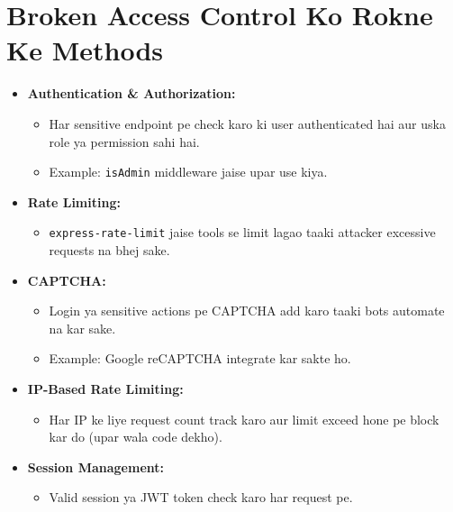 \documentclass[a4paper, 12pt]{article}
\begin{document}
\section{Broken Access Control Ko Rokne Ke Methods}
\begin{itemize}
    \item \textbf{\color{keyconceptgreen}Authentication \& Authorization:}
    \begin{itemize}
        \item Har sensitive endpoint pe check karo ki user authenticated hai aur uska role ya permission sahi hai.
        \item Example: \texttt{isAdmin} middleware jaise upar use kiya.
    \end{itemize}
    
    \item \textbf{\color{keyconceptgreen}Rate Limiting:}
    \begin{itemize}
        \item \texttt{express-rate-limit} jaise tools se limit lagao taaki attacker excessive requests na bhej sake.
    \end{itemize}
    
    \item \textbf{\color{keyconceptgreen}CAPTCHA:}
    \begin{itemize}
        \item Login ya sensitive actions pe CAPTCHA add karo taaki bots automate na kar sake.
        \item Example: Google reCAPTCHA integrate kar sakte ho.
    \end{itemize}
    
    \item \textbf{\color{keyconceptgreen}IP-Based Rate Limiting:}
    \begin{itemize}
        \item Har IP ke liye request count track karo aur limit exceed hone pe block kar do (upar wala code dekho).
    \end{itemize}
    
    \item \textbf{\color{keyconceptgreen}Session Management:}
    \begin{itemize}
        \item Valid session ya JWT token check karo har request pe.
    \end{itemize}
\end{itemize}
\end{document}
